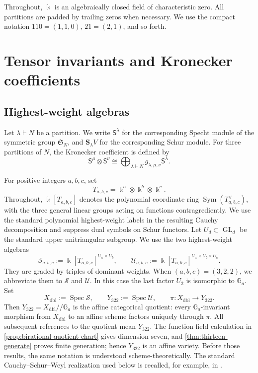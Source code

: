 \documentclass[11pt,reqno]{amsart}
\numberwithin{equation}{section}
\theoremstyle{remark}
\newcommand{\kk}{\Bbbk}
\newcommand{\SR}{\mathscr S}
\newcommand{\UR}{\mathscr U}
\newcommand{\Spec}{\operatorname{Spec}}
\newcommand{\Sym}{\operatorname{Sym}}
\newcommand{\GL}{\operatorname{GL}}
\newcommand{\Schur}{\mathbf{S}}
\newcommand{\Specht}{\mathsf{S}}
\begin{document}
Throughout, $\kk$ is an algebraically closed field of characteristic zero.
All partitions are padded by trailing zeros when necessary.  We use the
compact notation $110=(1,1,0)$, $21=(2,1)$, and so forth.

\section{Tensor invariants and Kronecker coefficients}
\label{sec:invariants}

\subsection{Highest-weight algebras}

Let $\lambda\vdash N$ be a partition.  We write $\Specht^\lambda$ for
the corresponding Specht module of the symmetric group $\mathfrak S_N$,
and $\Schur_\lambda V$ for the corresponding Schur module.  For three
partitions of $N$, the Kronecker coefficient is defined by
\[ \Specht^\mu\otimes\Specht^\nu \cong\bigoplus_{\lambda\vdash N} g_{\lambda,\mu,\nu}\Specht^\lambda. \]

For positive integers $a,b,c$, set
\[ T_{a,b,c}=\kk^a\otimes\kk^b\otimes\kk^c. \]
Throughout, $\kk[T_{a,b,c}]$ denotes the polynomial coordinate ring
$\Sym(T_{a,b,c}^{\vee})$, with the three general linear groups acting on
functions contragrediently.  We use the standard polynomial highest-weight
labels in the resulting Cauchy decomposition and suppress dual symbols on
Schur functors.  Let $U_d\subset\GL_d$ be the standard upper unitriangular
subgroup.
We use the two highest-weight algebras
\[ \SR_{a,b,c} :=\kk[T_{a,b,c}]^{U_a\times U_b}, \qquad \UR_{a,b,c} :=\kk[T_{a,b,c}]^{U_a\times U_b\times U_c}. \]
They are graded by triples of dominant weights.  When
$(a,b,c)=(3,2,2)$, we abbreviate them to $\SR$ and $\UR$.  In this
case the last factor $U_2$ is isomorphic to $\mathbb G_a$.  Set
\[ X_{\mathrm{dbl}}:=\Spec\SR, \qquad Y_{322}:=\Spec\UR, \qquad \pi:X_{\mathrm{dbl}}\longrightarrow Y_{322}. \]
Then $Y_{322}=X_{\mathrm{dbl}}/\!/\mathbb G_a$ is the affine categorical
quotient: every $\mathbb G_a$-invariant morphism from
$X_{\mathrm{dbl}}$ to an affine scheme factors uniquely through $\pi$.
All subsequent references to the quotient mean $Y_{322}$.  The function
field calculation in \cref{prop:birational-quotient-chart} gives dimension
seven, and \cref{thm:thirteen-generate} proves finite generation; hence
$Y_{322}$ is an affine variety.  Before those results, the same notation is
understood scheme-theoretically.  The standard Cauchy--Schur--Weyl
realization used below is recalled, for example, in
\cite[Chapter~I]{Macdonald}.
\end{document}
